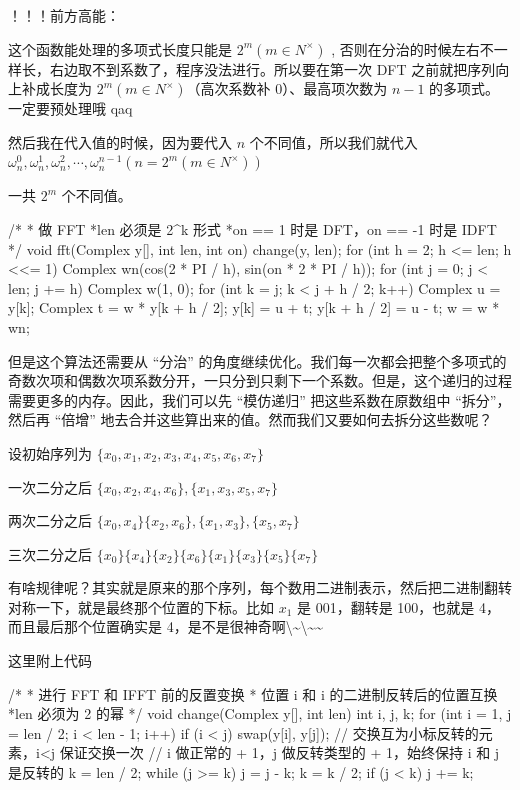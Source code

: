 ！！！前方高能：

这个函数能处理的多项式长度只能是 $2^m(m \in N^ \times )$ , 否则在分治的时候左右不一样长，右边取不到系数了，程序没法进行。所以要在第一次 DFT 之前就把序列向上补成长度为 $2^m(m \in N^ \times )$（高次系数补 $0$）、最高项次数为 $n-1$ 的多项式。一定要预处理哦 qaq

然后我在代入值的时候，因为要代入 $n$ 个不同值，所以我们就代入 $\omega_n^0,\omega_n^1,\omega_n^2,\cdots, \omega_n^{n-1} (n=2^m(m \in N^ \times ))$

一共 $2^m$ 个不同值。

\begin{cppcode}
/*
 * 做 FFT
 *len 必须是 2^k 形式
 *on == 1 时是 DFT，on == -1 时是 IDFT
 */
void fft(Complex y[], int len, int on) {
  change(y, len);
  for (int h = 2; h <= len; h <<= 1) {
    Complex wn(cos(2 * PI / h), sin(on * 2 * PI / h));
    for (int j = 0; j < len; j += h) {
      Complex w(1, 0);
      for (int k = j; k < j + h / 2; k++) {
        Complex u = y[k];
        Complex t = w * y[k + h / 2];
        y[k] = u + t;
        y[k + h / 2] = u - t;
        w = w * wn;
      }
    }
  }
}
\end{cppcode}

但是这个算法还需要从 “分治” 的角度继续优化。我们每一次都会把整个多项式的奇数次项和偶数次项系数分开，一只分到只剩下一个系数。但是，这个递归的过程需要更多的内存。因此，我们可以先 “模仿递归” 把这些系数在原数组中 “拆分”，然后再 “倍增” 地去合并这些算出来的值。然而我们又要如何去拆分这些数呢？

设初始序列为 $\{x_0, x_1, x_2, x_3, x_4, x_5, x_6, x_7\}$

一次二分之后 $\{x_0, x_2, x_4, x_6\},\{x_1, x_3,x_5, x_7 \}$

两次二分之后 $\{x_0,x_4\} \{x_2, x_6\},\{x_1, x_3\},\{x_5, x_7 \}$

三次二分之后 $\{x_0\}\{x_4\}\{x_2\}\{x_6\}\{x_1\}\{x_3\}\{x_5\}\{x_7 \}$

有啥规律呢？其实就是原来的那个序列，每个数用二进制表示，然后把二进制翻转对称一下，就是最终那个位置的下标。比如 $x_1$ 是 001，翻转是 100，也就是 4，而且最后那个位置确实是 4，是不是很神奇啊\textbackslash{}\textasciitilde{}\textbackslash{}\textasciitilde{}\textasciitilde{}

这里附上代码

\begin{cppcode}
/*
 * 进行 FFT 和 IFFT 前的反置变换
 * 位置 i 和 i 的二进制反转后的位置互换
 *len 必须为 2 的幂
 */
void change(Complex y[], int len) {
  int i, j, k;
  for (int i = 1, j = len / 2; i < len - 1; i++) {
    if (i < j) swap(y[i], y[j]);
    // 交换互为小标反转的元素，i<j 保证交换一次
    // i 做正常的 + 1，j 做反转类型的 + 1，始终保持 i 和 j 是反转的
    k = len / 2;
    while (j >= k) {
      j = j - k;
      k = k / 2;
    }
    if (j < k) j += k;
  }
}
\end{cppcode}

